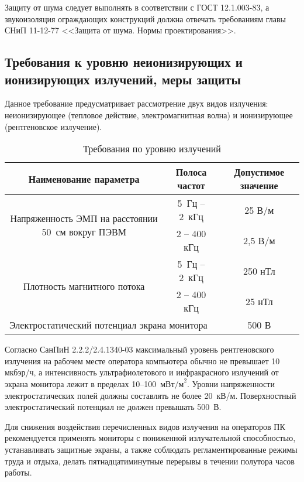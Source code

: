 Защиту от шума следует выполнять в соответствии с ГОСТ 12.1.003-83, а звукоизоляция ограждающих конструкций должна отвечать требованиям главы СНиП 11-12-77 <<Защита от шума. Нормы проектирования>>. 

\subsection{Требования к уровню неионизирующих и ионизирующих излучений, меры защиты}
Данное требование предусматривает рассмотрение двух видов излучения: неионизирующее (тепловое действие, электромагнитная волна) и ионизирующее (рентгеновское излучение). 

\begin{table}[h]
\caption{Требования по уровню излучений}
\label{emission_gost}
\begin{tabular}{|c|c|c|}
\hline
	Наименование параметра & Полоса частот & Допустимое значение \\
\hline
	\multirow{2}{*}{\parbox{7cm}{Напряженность ЭМП на расстоянии 50~см вокруг ПЭВМ}} & 5~Гц -- 2~кГц & 25 В/м \\
\cline{2-3}
	& 2 -- 400 кГц & 2,5 В/м \\
\hline
	\multirow{2}{*}{\parbox{7cm}{Плотность магнитного потока}} & 5~Гц -- 2~кГц & 250 нТл \\
\cline{2-3}
	& 2 -- 400 кГц & 25 нТл \\
\hline
	\multicolumn{2}{|l|}{Электростатический потенциал экрана монитора} & 500 В \\
\hline
\end{tabular}
\end{table}

Согласно СанПиН 2.2.2/2.4.1340-03 максимальный уровень рентгеновского излучения на рабочем месте оператора компьютера обычно не превышает 10 мкбэр/ч, а интенсивность ультрафиолетового и инфракрасного излучений от экрана монитора лежит в пределах 10–100~$\mbox{мВт/м}^2$. Уровни напряженности электростатических полей должны составлять не более 20~кВ/м. Поверхностный электростатический потенциал не должен превышать 500~В.

Для снижения воздействия перечисленных видов излучения на операторов ПК рекомендуется применять мониторы с пониженной излучательной способностью, устанавливать защитные экраны, а также соблюдать регламентированные режимы труда и отдыха, делать пятнадцатиминутные перерывы в течении полутора часов работы.

